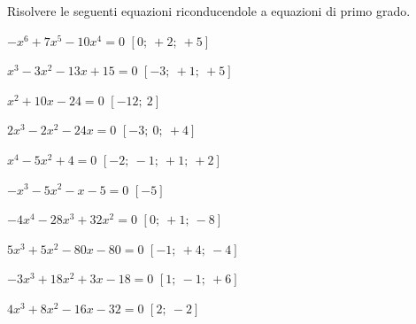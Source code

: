\begin{esercizio}[\Ast]
\label{ese:20.6}
Risolvere le seguenti equazioni riconducendole a equazioni di primo grado.
\begin{multicols}{2}
\begin{enumeratea}
 \item $-x^{6}+7x^{5}-10x^{4}=0$ \hfill $\left[0;~+2;~+5\right]$
 \item $x^{3}-3x^{2}-13x+15=0$ \hfill $\left[-3;~+1;~+5\right]$
 \item $x^{2}+10x-24=0$ \hfill $\left[-12;~2\right]$
 \item $2x^{3}-2x^{2}-24x=0$ \hfill $\left[-3;~0;~+4\right]$
 \item $x^{4}-5x^{2}+4=0$ \hfill $\left[-2;~-1;~+1;~+2\right]$
 \item $-x^{3}-5x^{2}-x-5=0$ \hfill $\left[-5\right]$
 \item $-4x^{4}-28x^{3}+32x^{2}=0$ \hfill $\left[0;~+1;~-8\right]$
 \item $5x^{3}+5x^{2}-80x-80=0$ \hfill $\left[-1;~+4;~-4\right]$
 \item $-3x^{3}+18x^{2}+3x-18=0$ \hfill $\left[1;~-1;~+6\right]$
 \item $4x^{3}+8x^{2}-16x-32=0$ \hfill $\left[2;~-2\right]$
\end{enumeratea}
\end{multicols}
\end{esercizio}

